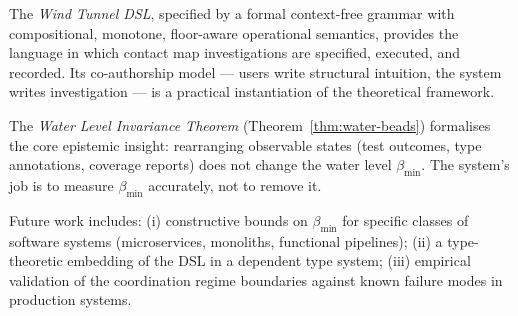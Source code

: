 \documentclass[12pt,a4paper,twocolumn]{article}
\theoremstyle{plain}
\theoremstyle{definition}
\theoremstyle{remark}
\newcommand{\bmin}{\beta_{\min}}
\begin{document}
The \emph{Wind Tunnel DSL}, specified by a formal context-free grammar with
compositional, monotone, floor-aware operational semantics, provides the
language in which contact map investigations are specified, executed, and
recorded.  Its co-authorship model --- users write structural intuition, the
system writes investigation --- is a practical instantiation of the
theoretical framework.

The \emph{Water Level Invariance Theorem} (Theorem~\ref{thm:water-beads})
formalises the core epistemic insight: rearranging observable states (test
outcomes, type annotations, coverage reports) does not change the water level
$\bmin$.  The system's job is to measure $\bmin$ accurately, not to remove
it.

Future work includes: (i) constructive bounds on $\bmin$ for specific classes
of software systems (microservices, monoliths, functional pipelines); (ii) a
type-theoretic embedding of the DSL in a dependent type system; (iii)
empirical validation of the coordination regime boundaries against known
failure modes in production systems.




\end{document}
